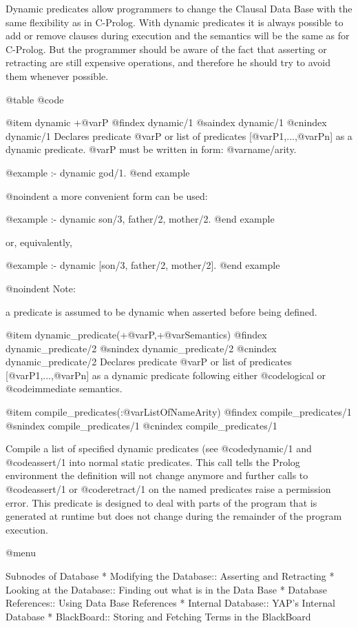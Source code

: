 {{{{{{Dynamic predicates allow programmers to change the Clausal Data Base with
the same flexibility as in C-Prolog. With dynamic predicates it is
always possible to add or remove clauses during execution and the
semantics will be the same as for C-Prolog. But the programmer should be
aware of the fact that asserting or retracting are still expensive operations, 
and therefore he should try to avoid them whenever possible.

@table @code

@item dynamic +@var{P}
@findex dynamic/1
@saindex dynamic/1
@cnindex dynamic/1
Declares predicate @var{P} or list of predicates [@var{P1},...,@var{Pn}]
as a dynamic predicate. @var{P} must be written in form:
@var{name/arity}.

@example
:- dynamic god/1.
@end example

@noindent 
a more convenient form can be used:

@example
:- dynamic son/3, father/2, mother/2.
@end example

or, equivalently,

@example
:- dynamic [son/3, father/2, mother/2].
@end example

@noindent
Note:

a predicate is assumed to be dynamic when 
asserted before being defined.

@item dynamic_predicate(+@var{P},+@var{Semantics})
@findex dynamic_predicate/2
@snindex dynamic_predicate/2
@cnindex dynamic_predicate/2
Declares predicate @var{P} or list of predicates [@var{P1},...,@var{Pn}]
as a dynamic predicate following either @code{logical} or
@code{immediate} semantics.
               
@item compile_predicates(:@var{ListOfNameArity})
@findex compile_predicates/1
@snindex compile_predicates/1
@cnindex compile_predicates/1

Compile a list of specified dynamic predicates (see @code{dynamic/1} and
@code{assert/1} into normal static predicates. This call tells the
Prolog environment the definition will not change anymore and further
calls to @code{assert/1} or @code{retract/1} on the named predicates
raise a permission error. This predicate is designed to deal with parts
of the program that is generated at runtime but does not change during
the remainder of the program execution.

@menu

Subnodes of Database
* Modifying the Database:: Asserting and Retracting
* Looking at the Database:: Finding out what is in the Data Base
* Database References:: Using Data Base References
* Internal Database:: YAP's Internal Database
* BlackBoard:: Storing and Fetching Terms in the BlackBoard

}}}}}}
